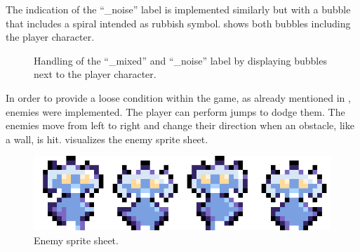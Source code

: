 The indication of the \enquote{\_noise} label is implemented similarly but with a bubble that includes a spiral intended as rubbish symbol.
 shows both bubbles including the player character.
\begin{figure}[!ht]
  \centering
  \hspace{2 cm}
  \caption{Handling of the \enquote{\_mixed} and \enquote{\_noise} label by displaying bubbles next to the player character.}
  \label{fig:game_design_mechanic_bubble}
\end{figure}
\FloatBarrier
\noindent
In order to provide a loose condition within the game, as already mentioned in , enemies were implemented.
The player can perform jumps to dodge them.
The enemies move from left to right and change their direction when an obstacle, like a wall, is hit.
 visualizes the enemy sprite sheet.
\begin{figure}[!ht]
  \centering
  \includegraphics[height=0.07\textwidth]{./6_game/figs/game_design_mechanic_enemy.png}
  \caption{Enemy sprite sheet.}
  \label{fig:game_design_mechanic_enemy}
\end{figure}
\FloatBarrier
\noindent



